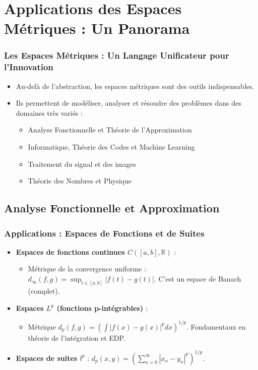 \documentclass{beamer}
\begin{document}
\section*{Applications des Espaces Métriques : Un Panorama}
\begin{frame}
	\frametitle{Les Espaces Métriques : Un Langage Unificateur pour l'Innovation}
	\begin{itemize}
		\item Au-delà de l'abstraction, les espaces métriques sont des outils indispensables.
		\item Ils permettent de modéliser, analyser et résoudre des problèmes dans des domaines très variés :
		      \begin{itemize}
			      \item Analyse Fonctionnelle et Théorie de l'Approximation
			      \item Informatique, Théorie des Codes et Machine Learning
			      \item Traitement du signal et des images
			      \item Théorie des Nombres et Physique
		      \end{itemize}
	\end{itemize}
\end{frame}

\subsection*{Analyse Fonctionnelle et Approximation}
\begin{frame}
	\frametitle{Applications : Espaces de Fonctions et de Suites}
	\begin{itemize}
		\item \textbf{Espaces de fonctions continues $C([a,b], \mathbb{R})$} :
		      \begin{itemize}
			      \item Métrique de la convergence uniforme : $d_\infty(f,g) = \sup_{t \in [a,b]} |f(t) - g(t)|$. C'est un espace de Banach (complet).
		      \end{itemize}
		\item \textbf{Espaces $L^p$ (fonctions p-intégrables)} :
		      \begin{itemize}
			      \item Métrique $d_p(f,g) = \left( \int |f(x)-g(x)|^p dx \right)^{1/p}$. Fondamentaux en théorie de l'intégration et EDP.
		      \end{itemize}
		\item \textbf{Espaces de suites $l^p$} : $d_p(x,y) = \left( \sum_{n=0}^\infty |x_n - y_n|^p \right)^{1/p}$.
	\end{itemize}
\end{frame}
\end{document}
